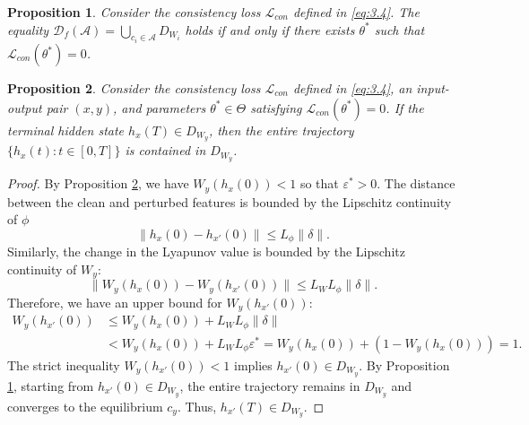 \documentclass[10pt,a4paper]{amsart}
\newtheorem{proposition}{Proposition}
\begin{document}
\begin{proposition} \label{propos:2}
	Consider the consistency loss $\mathcal{L}_{con}$ defined in \eqref{eq:3.4}. The equality $\mathcal{D}_{f}(\mathcal{A}) = \bigcup_{c_i \in \mathcal{A}} D_{W_i}$ holds if and only if there exists $\theta^*$ such that $\mathcal{L}_{con}(\theta^*) = 0$.
\end{proposition}

\begin{proposition} \label{propos:4}
	Consider the consistency loss $\mathcal{L}_{con}$ defined in \eqref{eq:3.4}, an input-output pair $(x,y)$, and parameters $\theta^* \in \Theta$ satisfying $\mathcal{L}_{con}(\theta^*) = 0$. If the terminal hidden state $h_x(T) \in D_{W_y}$, then the entire trajectory $\{h_x(t) : t \in [0,T]\}$ is contained in $D_{W_y}$. 
\end{proposition}

\begin{proof}
	By Proposition \ref{propos:4}, we have $W_y(h_x(0)) < 1$ so that $\varepsilon^* > 0$. The distance between the clean and perturbed features is bounded by the Lipschitz continuity of $\phi$
	\begin{equation*}
		\|h_x(0) - h_{x'}(0)\|  \leq L_\phi \|\delta\|.
	\end{equation*}
	Similarly, the change in the Lyapunov value is bounded by the Lipschitz continuity of $W_y$:
	\begin{equation*}
		\| W_y(h_x(0)) - W_y(h_{x'}(0)) \| \leq L_W L_\phi \|\delta\|.
	\end{equation*}
	Therefore, we have an upper bound for $W_y(h_{x'}(0))$:
	\begin{align*}
		W_y(h_{x'}(0)) &\leq W_y(h_x(0)) + L_W L_\phi \|\delta\| \\
		&< W_y(h_x(0)) + L_W L_\phi \varepsilon^* = W_y(h_x(0)) + (1 - W_y(h_x(0))) = 1.
	\end{align*}
	The strict inequality $W_y(h_{x'}(0)) < 1$ implies $h_{x'}(0) \in D_{W_y}$. By Proposition \ref{propos:2}, starting from $h_{x'}(0) \in D_{W_y}$, the entire trajectory remains in $D_{W_y}$ and converges to the equilibrium $c_y$. Thus, $h_{x'}(T) \in D_{W_y}$. 
\end{proof}
\end{document}
